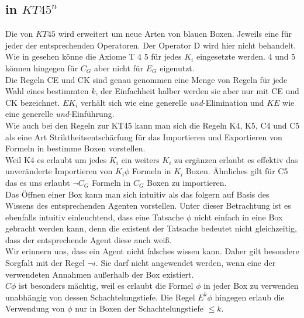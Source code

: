 \subsection{\ND in $KT45^n$}
Die \ND von $KT45$ wird erweitert um neue Arten von blauen Boxen.
Jeweils eine für jeder der entsprechenden Operatoren.
Der Operator D wird hier nicht behandelt.\\
Wie in  gesehen könne die Axiome T 4 5 für jedes $K_i$ eingesetzte werden. 4 und 5 können hingegen für $C_G$ aber nicht für $E_G$ eigenutzt.\\
Die Regeln CE und CK sind genau genommen eine Menge von Regeln für jede Wahl eines bestimmten $k$, der Einfachheit halber werden sie aber nur mit CE und CK bezeichnet.
$EK_i$ verhält sich wie eine generelle \emph{und}-Elimination und $KE$ wie eine generelle \emph{und}-Einführung.\\
Wie auch bei den Regeln zur KT45 kann man sich die Regeln K4, K5, C4 und C5 als eine Art Striktheitsentschärfung für das Importieren und Exportieren von Formeln in bestimme Boxen vorstellen.\\
Weil K4 es erlaubt um jedes $K_i$ ein weiters $K_i$ zu ergänzen erlaubt es effektiv das unveränderte Importieren von $K_i \phi$ Formeln in $K_i$ Boxen.
Ähnliches gilt für C5 das es uns erlaubt $\neg C_G$ Formeln in $C_G$ Boxen zu importieren.\\
Das Öffnen einer Box kann man sich intuitiv als das folgern auf Basis des Wissens des entsprechenden Agenten vorstellen.
Unter dieser Betrachtung ist es ebenfalls intuitiv einleuchtend, dass eine Tatsache $\phi$ nicht einfach in eine Box gebracht werden kann, denn die existent der Tatsache bedeutet nicht gleichzeitig, dass der entsprechende Agent diese auch weiß.\\
Wir erinnern uns, dass ein Agent nicht falsches wissen kann.
Daher gilt besondere Sorgfalt mit der Regel $\neg i$.
Sie darf nicht angewendet werden, wenn eine der verwendeten Annahmen außerhalb der Box existiert.\\
$C\phi$ ist besonders mächtig, weil es erlaubt die Formel $\phi$ in jeder Box zu verwenden unabhängig von dessen Schachtelungstiefe.
Die Regel $E^k \phi$ hingegen erlaub die Verwendung von $\phi$ nur in Boxen der Schachtelungstiefe $\leq k$.





